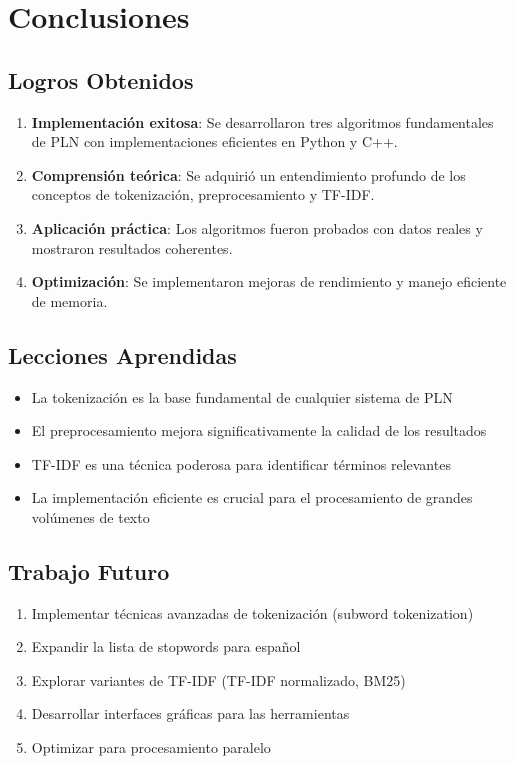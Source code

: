 \documentclass[12pt,a4paper]{article}
\begin{document}
\newpage

\section{Conclusiones}

\subsection{Logros Obtenidos}

\begin{enumerate}
    \item \textbf{Implementación exitosa}: Se desarrollaron tres algoritmos fundamentales de PLN con implementaciones eficientes en Python y C++.
    
    \item \textbf{Comprensión teórica}: Se adquirió un entendimiento profundo de los conceptos de tokenización, preprocesamiento y TF-IDF.
    
    \item \textbf{Aplicación práctica}: Los algoritmos fueron probados con datos reales y mostraron resultados coherentes.
    
    \item \textbf{Optimización}: Se implementaron mejoras de rendimiento y manejo eficiente de memoria.
\end{enumerate}

\subsection{Lecciones Aprendidas}

\begin{itemize}
    \item La tokenización es la base fundamental de cualquier sistema de PLN
    \item El preprocesamiento mejora significativamente la calidad de los resultados
    \item TF-IDF es una técnica poderosa para identificar términos relevantes
    \item La implementación eficiente es crucial para el procesamiento de grandes volúmenes de texto
\end{itemize}

\subsection{Trabajo Futuro}

\begin{enumerate}
    \item Implementar técnicas avanzadas de tokenización (subword tokenization)
    \item Expandir la lista de stopwords para español
    \item Explorar variantes de TF-IDF (TF-IDF normalizado, BM25)
    \item Desarrollar interfaces gráficas para las herramientas
    \item Optimizar para procesamiento paralelo
\end{enumerate}
\end{document}
